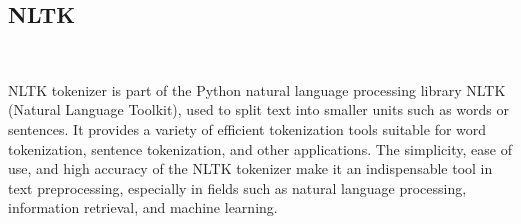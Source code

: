 \subsection{NLTK}
\

NLTK tokenizer is part of the Python natural language processing library NLTK (Natural Language Toolkit), used to split text into smaller units such as words or sentences. It provides a variety of efficient tokenization tools suitable for word tokenization, sentence tokenization, and other applications. The simplicity, ease of use, and high accuracy of the NLTK tokenizer make it an indispensable tool in text preprocessing, especially in fields such as natural language processing, information retrieval, and machine learning.